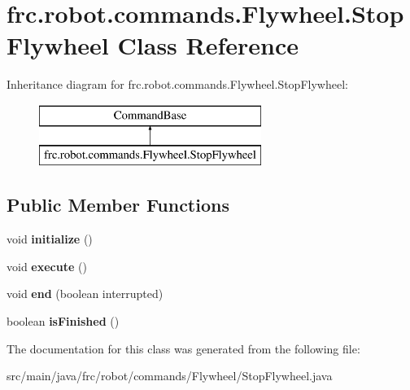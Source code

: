 \hypertarget{classfrc_1_1robot_1_1commands_1_1_flywheel_1_1_stop_flywheel}{}\section{frc.\+robot.\+commands.\+Flywheel.\+Stop\+Flywheel Class Reference}
\label{classfrc_1_1robot_1_1commands_1_1_flywheel_1_1_stop_flywheel}
Inheritance diagram for frc.\+robot.\+commands.\+Flywheel.\+Stop\+Flywheel\+:\begin{figure}[H]
\begin{center}
\leavevmode
\includegraphics[height=2.000000cm]{classfrc_1_1robot_1_1commands_1_1_flywheel_1_1_stop_flywheel}
\end{center}
\end{figure}
\subsection*{Public Member Functions}
\begin{DoxyCompactItemize}
\item 
\mbox{\label{classfrc_1_1robot_1_1commands_1_1_flywheel_1_1_stop_flywheel_a473eb85f51cea789b2ade0d5e5f70bcd}} 
void {\bfseries initialize} ()
\item 
\mbox{\label{classfrc_1_1robot_1_1commands_1_1_flywheel_1_1_stop_flywheel_a9690c5d7b726a229b5ecb43b9522d815}} 
void {\bfseries execute} ()
\item 
\mbox{\label{classfrc_1_1robot_1_1commands_1_1_flywheel_1_1_stop_flywheel_ad34f119d1afdb1f0909633a145f07862}} 
void {\bfseries end} (boolean interrupted)
\item 
\mbox{\label{classfrc_1_1robot_1_1commands_1_1_flywheel_1_1_stop_flywheel_a36741ebd5c218fdbb07ea22f12f42cf4}} 
boolean {\bfseries is\+Finished} ()
\end{DoxyCompactItemize}


The documentation for this class was generated from the following file\+:\begin{DoxyCompactItemize}
\item 
src/main/java/frc/robot/commands/\+Flywheel/Stop\+Flywheel.\+java\end{DoxyCompactItemize}
